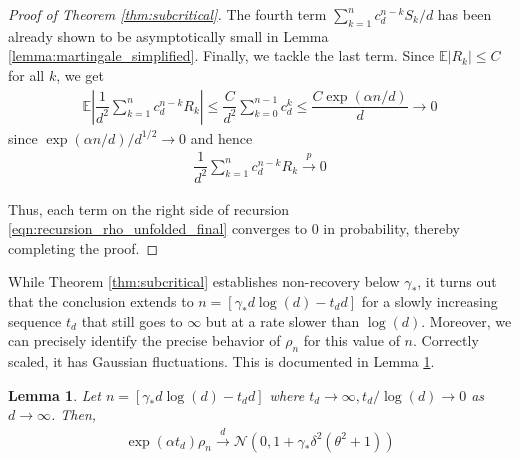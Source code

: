 \documentclass[12pt]{article}
\newtheorem{lemma}[theorem]{Lemma}      %
\def\gF{{\mathcal{F}}}
\def\gN{{\mathcal{N}}}
\newcommand{\E}{\mathbb{E}}
\begin{document}
\begin{proof}[Proof of Theorem \ref{thm:subcritical}]
The fourth term $\sum_{k=1}^n c_d^{n-k}S_k/d$ has been already shown to be asymptotically small in Lemma \ref{lemma:martingale_simplified}. Finally, we tackle the last term. Since $\E|R_k|\leq C$ for all $k$, we get
\begin{align*}
    \E\left|\dfrac{1}{d^2}\sum_{k=1}^n c_d^{n-k}R_k\right| \leq \dfrac{C}{d^2}\sum_{k=0}^{n-1}c_d^k\leq \dfrac{C\exp(\alpha n/d)}{d}\to 0
\end{align*}since $\exp(\alpha n/d)/d^{1/2}\to 0$ and hence 
\begin{align*}
\dfrac{1}{d^2}\sum_{k=1}^n c_d^{n-k}R_k\stackrel{p}{\to}0    
\end{align*}


Thus, each term on the right side of recursion \ref{eqn:recursion_rho_unfolded_final} converges to $0$ in probability, thereby completing the proof.
\end{proof}



\medskip

While Theorem \ref{thm:subcritical} establishes non-recovery below $\gamma_*$, it turns out that the conclusion extends to $n=[\gamma_*d\log(d)-t_dd]$ for a slowly increasing sequence $t_d$ that still goes to $\infty$ but at a rate slower than $\log(d)$. Moreover, we can precisely identify the precise behavior of $\rho_n$ for this value of $n$. Correctly scaled, it has Gaussian fluctuations. This is documented in Lemma \ref{lemma:exact_behavior_rho_subcritical}.

\medskip

\begin{lemma}\label{lemma:exact_behavior_rho_subcritical}
    Let $n=[\gamma_*d\log(d)-t_dd]$ where $t_d\to\infty,t_d/\log(d)\to0$ as $d\to\infty$. Then,
    \begin{align*}
        \exp(\alpha t_d)\rho_n\stackrel{d}{\to}\gN(0, 1+\gamma_*\delta^2(\theta^2+1))
    \end{align*}
\end{lemma}
\end{document}
